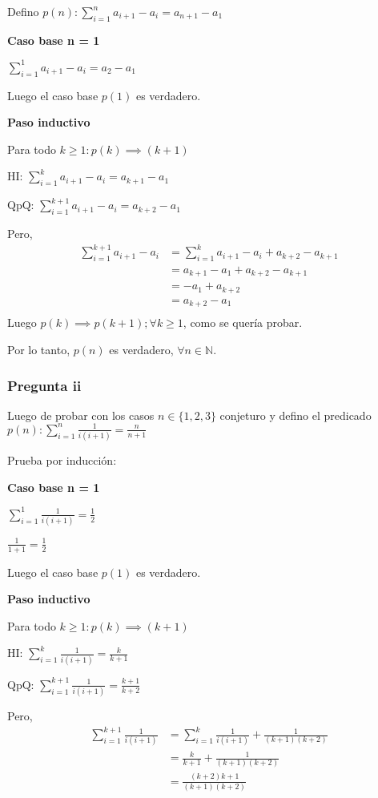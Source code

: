 Defino $p(n) : \sum_{i=1}^{n}a_{i+1}-a_i = a_{n+1} - a_1$

\textbf{Caso base n = 1}

$\sum_{i=1}^{1}a_{i+1}-a_i = a_2 - a_1$

Luego el caso base $p(1)$ es verdadero.

\textbf{Paso inductivo}

Para todo $k \geq 1: p(k) \implies (k+1)$

HI: $\sum_{i=1}^{k}a_{i+1}-a_i = a_{k+1} - a_1$

QpQ: $\sum_{i=1}^{k+1}a_{i+1}-a_i = a_{k+2} - a_1$

Pero,
\begin{align*}
    \sum_{i=1}^{k+1}a_{i+1}-a_i &= \sum_{i=1}^{k}a_{i+1}-a_i + a_{k+2} - a_{k+1} \\
    &= a_{k+1} - a_1 + a_{k+2} - a_{k+1} \\
    &= - a_1 + a_{k+2} \\
    &= a_{k+2} - a_1 \\
\end{align*}
Luego $p(k) \implies p(k+1); \forall k \geq 1$, como se quería probar.

Por lo tanto, $p(n)$ es verdadero, $\forall n \in \mathbb{N}$.

\subsubsection{Pregunta ii}

Luego de probar con los casos $n \in \{ 1,2,3 \}$ conjeturo y defino el predicado $p(n): \sum_{i=1}^{n}\frac{1}{i(i+1)} = \frac{n}{n+1}$

Prueba por inducción:

\textbf{Caso base n = 1}

$\sum_{i=1}^{1}\frac{1}{i(i+1)} = \frac{1}{2}$

$ \frac{1}{1+1} = \frac{1}{2} $

Luego el caso base $p(1)$ es verdadero.

\textbf{Paso inductivo}

Para todo $k \geq 1: p(k) \implies (k+1)$

HI: $\sum_{i=1}^{k}\frac{1}{i(i+1)} = \frac{k}{k+1}$

QpQ: $\sum_{i=1}^{k+1}\frac{1}{i(i+1)} = \frac{k+1}{k+2}$

Pero,
\begin{align*}
    \sum_{i=1}^{k+1}\frac{1}{i(i+1)} &= \sum_{i=1}^{k}\frac{1}{i(i+1)} + \frac{1}{(k+1)(k+2)} \\
    &= \frac{k}{k+1} + \frac{1}{(k+1)(k+2)} \\
    &= \frac{(k+2)k + 1}{(k+1)(k+2)}
\end{align*}


